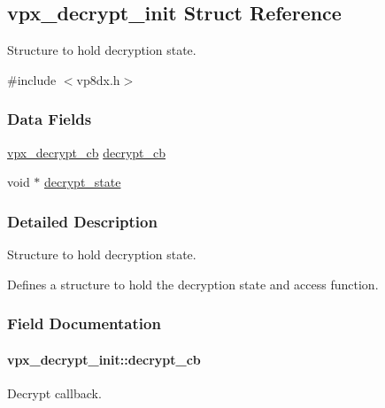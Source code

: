 \hypertarget{structvpx__decrypt__init}{}\subsection{vpx\+\_\+decrypt\+\_\+init Struct Reference}
\label{structvpx__decrypt__init}


Structure to hold decryption state.  




{\ttfamily \#include $<$vp8dx.\+h$>$}

\subsubsection*{Data Fields}
\begin{DoxyCompactItemize}
\item 
\hyperlink{group__vp8__decoder_ga10cdcbbc04aa831558688f4a4149fcbd}{vpx\+\_\+decrypt\+\_\+cb} \hyperlink{structvpx__decrypt__init_a493c968f9028314ab105441dc7134e2c}{decrypt\+\_\+cb}
\item 
void $\ast$ \hyperlink{structvpx__decrypt__init_a0a5b356c8cf98a547300abb872092714}{decrypt\+\_\+state}
\end{DoxyCompactItemize}


\subsubsection{Detailed Description}
Structure to hold decryption state. 

Defines a structure to hold the decryption state and access function. 

\subsubsection{Field Documentation}
\paragraph[{\texorpdfstring{decrypt\+\_\+cb}{decrypt_cb}}]{ vpx\+\_\+decrypt\+\_\+init\+::decrypt\+\_\+cb}\hypertarget{structvpx__decrypt__init_a493c968f9028314ab105441dc7134e2c}{}\label{structvpx__decrypt__init_a493c968f9028314ab105441dc7134e2c}
Decrypt callback. 
